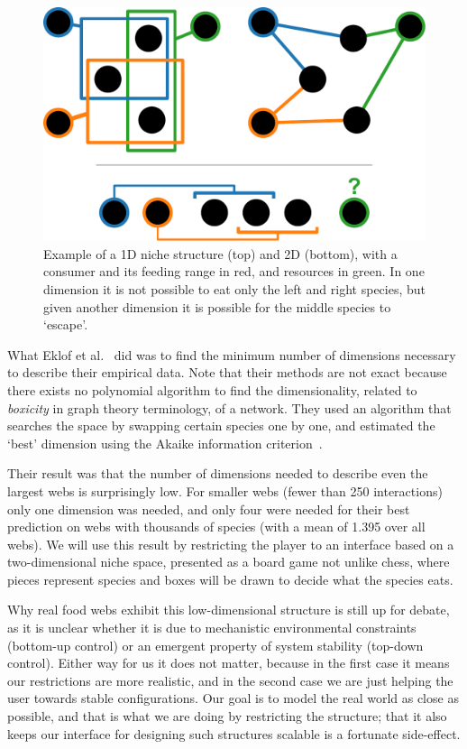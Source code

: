 \begin{figure}
    \centering
    \includegraphics[width=.8\linewidth]{niche.pdf}
    \caption{Example of a 1D niche structure (top) and 2D (bottom), with a consumer and its feeding range in red, and resources in green.
    In one dimension it is not possible to eat only the left and right species, but given another dimension it is possible for the middle species to `escape'.}
    \label{niche}
\end{figure}

What Eklof et al.~\cite{eklof} did was to find the minimum number of dimensions necessary to describe their empirical data. Note that their methods are not exact because there exists no polynomial algorithm to find the dimensionality, related to \emph{boxicity} in graph theory terminology, of a network. They used an algorithm that searches the space by swapping certain species one by one, and estimated the `best' dimension using the Akaike information criterion~\cite{eklof}.

Their result was that the number of dimensions needed to describe even the largest webs is surprisingly low. For smaller webs (fewer than 250 interactions) only one dimension was needed, and only four were needed for their best prediction on webs with thousands of species (with a mean of 1.395 over all webs).
We will use this result by restricting the player to an interface based on a two-dimensional niche space, presented as a board game not unlike chess, where pieces represent species and boxes will be drawn to decide what the species eats.

Why real food webs exhibit this low-dimensional structure is still up for debate, as it is unclear whether it is due to mechanistic environmental constraints (bottom-up control) or an emergent property of system stability (top-down control).
Either way for us it does not matter, because in the first case it means our restrictions are more realistic, and in the second case we are just helping the user towards stable configurations.
Our goal is to model the real world as close as possible, and that is what we are doing by restricting the structure; that it also keeps our interface for designing such structures scalable is a fortunate side-effect.

